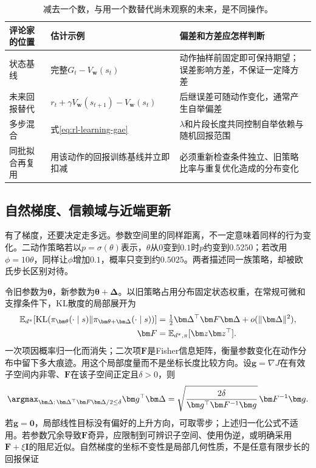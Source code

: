 \begin{table}[t]
  \centering
  \small
  \begin{tabularx}{\linewidth}{>{\raggedright\arraybackslash}p{30mm} >{\raggedright\arraybackslash}X >{\raggedright\arraybackslash}X}
    \toprule
    评论家的位置 & 估计示例 & 偏差和方差应怎样判断 \\
    \midrule
    状态基线 & 完整$G_t-V_{\bm w}(s_t)$ & 动作抽样前固定即可保持期望；误差影响方差，不保证一定降方差 \\
    未来回报替代 & $r_t+\gamma V_{\bm w}(s_{t+1})-V_{\bm w}(s_t)$ & 后继误差可随动作变化，通常产生自举偏差 \\
    多步混合 & 式\eqref{eq:rl-learning-gae} & $\lambda$和片段长度共同控制自举依赖与随机回报范围 \\
    同批拟合再复用 & 用该动作的回报训练基线并立即扣减 & 必须重新检查条件独立、旧策略比率与重复优化造成的分布变化 \\
    \bottomrule
  \end{tabularx}
  \caption{减去一个数，与用一个数替代尚未观察的未来，是不同操作。}
  \label{tab:rl-learning-baseline-bootstrap}
\end{table}

\subsection{自然梯度、信赖域与近端更新}
\label{sec:rl-learning-trust-region}

有了梯度，还要决定走多远。参数空间里的同样距离，不一定意味着同样的行为变化。二动作策略若以$p=\sigma(\theta)$表示，$\theta$从0变到$0.1$时$p$约变到$0.5250$；若改用$\phi=10\theta$，同样让$\phi$增加$0.1$，概率只变到约$0.5025$。两者描述同一族策略，却被欧氏步长区别对待。

令旧参数为$\bm\theta$，新参数为$\bm\theta+\bm\Delta$。以旧策略占用分布固定状态权重，在常规可微和支撑条件下，KL散度的局部展开为
\begin{align}
  \mathbb E_{d^\pi}\!
    \left[\operatorname{KL}
       (\pi_{\bm\theta}(\cdot\mid s)
           \Vert\pi_{\bm\theta+\bm\Delta}(\cdot\mid s))\right]
    &=\tfrac12\bm\Delta^\top\bm F\bm\Delta
         +o(\lVert\bm\Delta\rVert^2), \notag\\
  \bm F&=\mathbb E_{d^\pi,\pi}[\bm z\bm z^\top].
  \label{eq:rl-learning-fisher}
\end{align}
一次项因概率归一化而消失；二次项$\bm F$是Fisher信息矩阵，衡量参数变化在动作分布中留下多大痕迹。用这个局部度量而不是坐标长度比较方向。设$\bm g=\nabla J$在有效子空间内非零、$\bm F$在该子空间正定且$\delta>0$，则
\[
  \argmax_{\bm\Delta:\,\bm\Delta^\top\bm F\bm\Delta/2\leq\delta}
       \bm g^\top\bm\Delta
     =
     \sqrt{\frac{2\delta}{\bm g^\top\bm F^{-1}\bm g}}\,
       \bm F^{-1}\bm g.
\]
若$\bm g=\bm0$，局部线性目标没有偏好的上升方向，可取零步；上述归一化公式不适用。若参数冗余导致$\bm F$奇异，应限制到可辨识子空间、使用伪逆，或明确采用$\bm F+\xi\bm I$的阻尼近似。自然梯度的坐标不变性是局部几何性质，不是任意有限步长的回报保证

